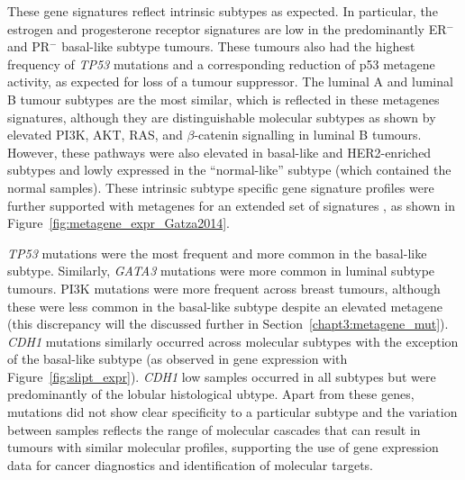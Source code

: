 These gene signatures reflect intrinsic subtypes as expected. In particular, the estrogen and progesterone receptor signatures are low in the predominantly ER$^-$ and PR$^-$ basal-like subtype tumours. These tumours also had the highest frequency of \textit{TP53} mutations and a corresponding reduction of p53 metagene activity, as expected for loss of a tumour suppressor. The luminal A and luminal B tumour subtypes are the most similar, which is reflected in these metagenes signatures, although they are distinguishable molecular subtypes as shown by elevated \gls{PI3K}, AKT, RAS, and $\beta$-catenin signalling in luminal B tumours. However, these pathways were also elevated in basal-like and HER2-enriched subtypes and lowly expressed in the ``normal-like'' subtype (which contained the normal samples). These intrinsic subtype specific gene signature profiles were further supported with metagenes for an extended set of signatures \citep{Gatza2014}, as shown in Figure~\ref{fig:metagene_expr_Gatza2014}.

\textit{TP53} mutations were the most frequent and more common in the basal-like subtype. Similarly, \textit{GATA3} mutations were more common in luminal subtype tumours. \gls{PI3K} mutations were more frequent across breast tumours, although these were less common in the basal-like subtype despite an elevated metagene (this discrepancy will the discussed further in Section~\ref{chapt3:metagene_mut}). \textit{CDH1} mutations similarly occurred across molecular subtypes with the exception of the basal-like subtype (as observed in gene expression with Figure~\ref{fig:slipt_expr}). \textit{CDH1} low samples occurred in all subtypes but were predominantly of the lobular histological ubtype. Apart from these genes, mutations did not show clear specificity to a particular subtype and the variation between samples reflects the range of molecular cascades that can result in tumours with similar molecular profiles, supporting the use of gene expression data for cancer diagnostics and identification of molecular targets. 

